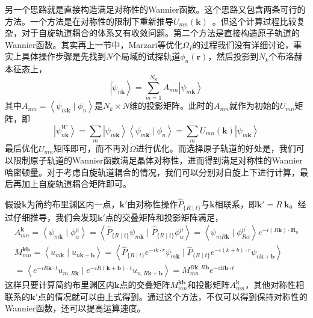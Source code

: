 另一个思路就是直接构造满足对称性的Wannier函数。这个思路又包含两条可行的方法。一个方法是在对称性的限制下重新推导$U_{mn}(\mathbf{k})$~\citep{sakuma}。但这个计算过程比较复杂，对于自旋轨道耦合的体系又有收敛问题。第二个方法是直接构造原子轨道的Wannier函数。其实再上一节中，Marzari等优化$\Omega_I$的过程我们没有详细讨论，事实上具体操作步骤是先找到$N$个局域的试探轨道$\phi_n(\mathbf{r})$，然后投影到$N_k$个布洛赫本征态上，
\begin{equation}
    \label{eq:2-29}
    \left|\tilde{\psi}_{n \mathbf{k}}\right\rangle=\sum_{m=1}^{N_{\mathbf{k}}} A_{m n}\left|\psi_{m \mathbf{k}}\right\rangle
\end{equation}
其中$A_{m n}=\left\langle\psi_{m \mathbf{k}} \mid \phi_{n}\right\rangle$是$N_k \times N$维的投影矩阵。此时的$A_{mn}$就作为初始的$U_{mn}$矩阵，即
\begin{equation}
    \label{eq:2-30}
    \left|\psi_{n \mathbf{k}}^{W}\right\rangle=\sum_{m}\left| \psi_{m \mathbf{k}}\right\rangle \left\langle\psi_{m \mathbf{k}}\mid \phi_{n}\right\rangle=\sum_{m} U_{m n}(\mathbf{k})\left| \psi_{m \mathbf{k}}\right\rangle
\end{equation}
最后优化$U_{mn}$矩阵即可，而不再对$\tilde{\Omega}$进行优化。而选择原子轨道的好处是，我们可以限制原子轨道的Wannier函数满足晶体对称性，进而得到满足对称性的Wannier哈密顿量。对于考虑自旋轨道耦合的情况，我们可以分别对自旋上下进行计算，最后再加上自旋轨道耦合矩阵即可。

假设$\mathbf{k}$为简约布里渊区内一点，$\mathbf{k'}$由对称性操作$\hat{P}_{\{R \mid t\}}$与$\mathbf{k}$相联系，即$\mathbf{k'}=R\ \mathbf{k}$。经过仔细推导，我们会发现$\mathbf{k'}$点的交叠矩阵和投影矩阵满足，
\begin{equation}
    \begin{array}{r}
    A_{m n}^{\mathbf{k}}=\left\langle\psi_{m \mathbf{k}} \mid \phi_{\alpha}^{\mu}\right\rangle=\left\langle\hat{P}_{\{R \mid t\}} \psi_{m \mathbf{k}} \mid \hat{P}_{\{R \mid t\}} \phi_{\alpha}^{\mu}\right\rangle=\left\langle\psi_{m R \mathbf{k}} \mid \phi_{R \alpha}^{\mu^{\prime}}\right\rangle e^{-i(R \mathbf{k}) \cdot \mathbf{R}_{0}} \\
    M_{m n}^{\mathbf{k b}}=\left\langle u_{m \mathbf{k}} \mid u_{n \mathbf{k}+\mathbf{b}}\right\rangle=\left\langle\hat{P}_{\{R \mid t\}} e^{-i k \cdot r} \psi_{m \mathbf{k}} \mid \hat{P}_{\{R \mid t\}} e^{-i(k+b) \cdot r} \psi_{n \mathbf{k}+\mathbf{b}}\right\rangle \\
    =\left\langle e^{-i R \mathbf{k} \cdot t} u_{m, R \mathbf{k}} \mid e^{-i R(\mathbf{k}+\mathbf{b}) \cdot t} u_{n, R \mathbf{k}+\mathbf{b}}\right\rangle=M_{m n}^{R \mathbf{k}, R \mathbf{b}} e^{-i R \mathbf{b} \cdot t}
    \end{array}
\end{equation}
这样只要计算简约布里渊区内$\mathbf{k}$点的交叠矩阵$M_{m n}^{\mathbf{k b}}$和投影矩阵$A_{m n}^{\mathbf{k}}$，其他对称性相联系的$\mathbf{k'}$点的情况就可以由上式得到。通过这个方法，不仅可以得到保持对称性的Wannier函数，还可以提高运算速度。




